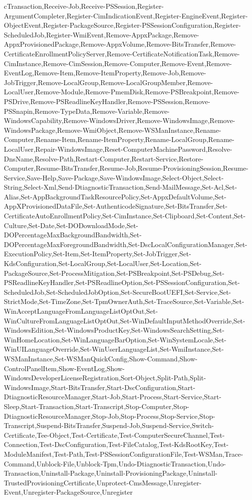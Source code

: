 {{cTransaction,Receive-Job,Receive-PSSession,Register-ArgumentCompleter,Register-CimIndicationEvent,Register-EngineEvent,Register-ObjectEvent,Register-PackageSource,Register-PSSessionConfiguration,Register-ScheduledJob,Register-WmiEvent,Remove-AppxPackage,Remove-AppxProvisionedPackage,Remove-AppxVolume,Remove-BitsTransfer,Remove-CertificateEnrollmentPolicyServer,Remove-CertificateNotificationTask,Remove-CimInstance,Remove-CimSession,Remove-Computer,Remove-Event,Remove-EventLog,Remove-Item,Remove-ItemProperty,Remove-Job,Remove-JobTrigger,Remove-LocalGroup,Remove-LocalGroupMember,Remove-LocalUser,Remove-Module,Remove-PmemDisk,Remove-PSBreakpoint,Remove-PSDrive,Remove-PSReadlineKeyHandler,Remove-PSSession,Remove-PSSnapin,Remove-TypeData,Remove-Variable,Remove-WindowsCapability,Remove-WindowsDriver,Remove-WindowsImage,Remove-WindowsPackage,Remove-WmiObject,Remove-WSManInstance,Rename-Computer,Rename-Item,Rename-ItemProperty,Rename-LocalGroup,Rename-LocalUser,Repair-WindowsImage,Reset-ComputerMachinePassword,Resolve-DnsName,Resolve-Path,Restart-Computer,Restart-Service,Restore-Computer,Resume-BitsTransfer,Resume-Job,Resume-ProvisioningSession,Resume-Service,Save-Help,Save-Package,Save-WindowsImage,Select-Object,Select-String,Select-Xml,Send-DtiagnosticTransaction,Send-MailMessage,Set-Acl,Set-Alias,Set-AppBackgroundTaskResourcePolicy,Set-AppxDefaultVolume,Set-AppXProvisionedDataFile,Set-AuthenticodeSignature,Set-BitsTransfer,Set-CertificateAutoEnrollmentPolicy,Set-CimInstance,Set-Clipboard,Set-Content,Set-Culture,Set-Date,Set-DODownloadMode,Set-DOPercentageMaxBackgroundBandwidth,Set-DOPercentageMaxForegroundBandwidth,Set-DscLocalConfigurationManager,Set-ExecutionPolicy,Set-Item,Set-ItemProperty,Set-JobTrigger,Set-KdsConfiguration,Set-LocalGroup,Set-LocalUser,Set-Location,Set-PackageSource,Set-ProcessMitigation,Set-PSBreakpoint,Set-PSDebug,Set-PSReadlineKeyHandler,Set-PSReadlineOption,Set-PSSessionConfiguration,Set-ScheduledJob,Set-ScheduledJobOption,Set-SecureBootUEFI,Set-Service,Set-StrictMode,Set-TimeZone,Set-TpmOwnerAuth,Set-TraceSource,Set-Variable,Set-WinAcceptLanguageFromLanguageListOptOut,Set-WinCultureFromLanguageListOptOut,Set-WinDefaultInputMethodOverride,Set-WindowsEdition,Set-WindowsProductKey,Set-WindowsSearchSetting,Set-WinHomeLocation,Set-WinLanguageBarOption,Set-WinSystemLocale,Set-WinUILanguageOverride,Set-WinUserLanguageList,Set-WmiInstance,Set-WSManInstance,Set-WSManQuickConfig,Show-Command,Show-ControlPanelItem,Show-EventLog,Show-WindowsDeveloperLicenseRegistration,Sort-Object,Split-Path,Split-WindowsImage,Start-BitsTransfer,Start-DscConfiguration,Start-DtiagnosticResourceManager,Start-Job,Start-Process,Start-Service,Start-Sleep,Start-Transaction,Start-Transcript,Stop-Computer,Stop-DtiagnosticResourceManager,Stop-Job,Stop-Process,Stop-Service,Stop-Transcript,Suspend-BitsTransfer,Suspend-Job,Suspend-Service,Switch-Certificate,Tee-Object,Test-Certificate,Test-ComputerSecureChannel,Test-Connection,Test-DscConfiguration,Test-FileCatalog,Test-KdsRootKey,Test-ModuleManifest,Test-Path,Test-PSSessionConfigurationFile,Test-WSMan,Trace-Command,Unblock-File,Unblock-Tpm,Undo-DtiagnosticTransaction,Undo-Transaction,Uninstall-Package,Uninstall-ProvisioningPackage,Uninstall-TrustedProvisioningCertificate,Unprotect-CmsMessage,Unregister-Event,Unregister-PackageSource,Unregister}}

